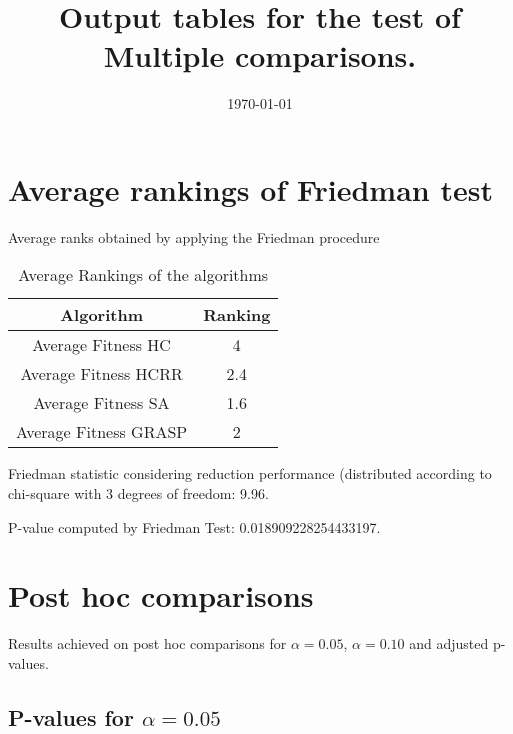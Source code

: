 \documentclass[a4paper,10pt]{article}
\title{Output tables for the test of Multiple comparisons.}
\author{}
\date{\today}
\begin{document}
\begin{landscape}
\pagestyle{empty}
\maketitle
\thispagestyle{empty}
\section{Average rankings of Friedman test}



Average ranks obtained by applying the Friedman procedure

\begin{table}[!htp]
\centering
\begin{tabular}{|c|c|}\hline
Algorithm&Ranking\\\hline
Average Fitness HC & 4\\
Average Fitness HCRR & 2.4\\
Average Fitness SA & 1.6\\
Average Fitness GRASP & 2\\
\hline
\end{tabular}
\caption{Average Rankings of the algorithms}
\end{table}

Friedman statistic considering reduction performance (distributed according to chi-square with 3 degrees of freedom: 9.96.

P-value computed by Friedman Test: 0.018909228254433197.\newline



\pagebreak

\section{Post hoc comparisons}

Results achieved on post hoc comparisons for $\alpha = 0.05$, $\alpha = 0.10$ and adjusted p-values.

\subsection{P-values for $\alpha=0.05$}


\end{landscape}
\end{document}
